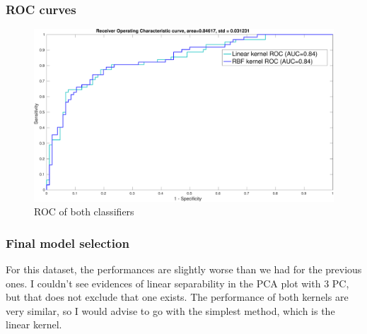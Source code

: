 \documentclass[11pt, a4paper]{article}
\begin{document}
\subsubsection{ROC curves}

\begin{figure}[H]
    \centering
    \includegraphics[scale=.40]{diabetes_ROC.pdf}
    \caption{ROC of both classifiers}
    \label{fig:diabetes_ROC}
\end{figure}

\subsubsection{Final model selection}

For this dataset, the performances are slightly worse than we had for
the previous ones. I couldn't see evidences of linear separability in
the PCA plot with 3 PC, but that does not exclude that one exists. The
performance of both kernels are very similar, so I would advise to go
with the simplest method, which is the linear kernel.

% 
\end{document}
